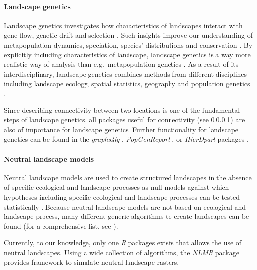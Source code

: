 \documentclass[smallextended]{svjour3}       %
\begin{document}
\hypertarget{sec:landscape_genetics}{%
\paragraph{Landscape genetics}\label{sec:landscape_genetics}}

Landscape genetics investigates how characteristics of landscapes
interact with gene flow, genetic drift and selection \cite{Manel2003}.
Such insights improve our understanding of metapopulation dynamics,
speciation, species' distributions and conservation \cite{Storfer2007}.
By explicitly including characteristics of landscape, landscape genetics
is a way more realistic way of analysis than e.g.~metapopulation
genetics \cite{Holderegger2006}. As a result of its interdisciplinary,
landscape genetics combines methods from different disciplines including
landscape ecology, spatial statistics, geography and population genetics
\cite{Storfer2007}.

Since describing connectivity between two locations is one of the
fundamental steps of landscape genetics, all packages useful for
connectivity (see \ref{sec:landscape_genetics}) are also of importance
for landscape genetics. Further functionality for landscape genetics can
be found in the \emph{graphs4lg} \cite{Savary2020}, \emph{PopGenReport}
\cite{Adamack2014,Gruber2015}, or \emph{HierDpart} packages
\cite{Qin2019}.

\hypertarget{sec:NLM}{%
\paragraph{Neutral landscape models}\label{sec:NLM}}

Neutral landscape models are used to create structured landscapes in the
absence of specific ecological and landscape processes as null models
against which hypotheses including specific ecological and landscape
processes can be tested statistically \cite{Gardner1987,With1997}.
Because neutral landscape models are not based on ecological and
landscape process, many different generic algorithms to create
landscapes can be found (for a comprehensive list, see
\cite{Sciaini2018}).

Currently, to our knowledge, only one \emph{R} packages exists that
allows the use of neutral landscapes. Using a wide collection of
algorithms, the \emph{NLMR} package \cite{Sciaini2018} provides
framework to simulate neutral landscape rasters.



\end{document}
